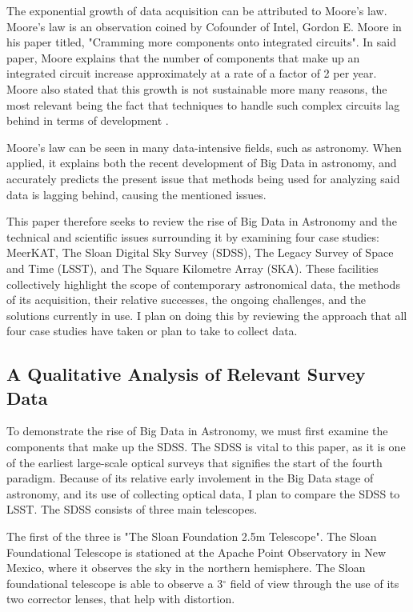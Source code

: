 \documentclass[preprint2,linenumbers, longauthor]{aastex631}
\begin{document}
The exponential growth of data acquisition can be attributed to Moore's law. Moore's law is an observation coined by Cofounder of Intel, Gordon E. Moore in his paper titled, "Cramming more components onto integrated circuits". 
In said paper, Moore explains that the number of components that make up an integrated circuit increase approximately at a rate of a factor of 2 per year.
Moore also stated that this growth is not sustainable more many reasons, the most relevant being the fact that techniques to handle such complex circuits lag behind in terms of development \cite{mooreCrammingMoreComponents2006}.

Moore's law can be seen in many data-intensive fields, such as astronomy.
When applied, it explains both the recent development of Big Data in astronomy, and accurately predicts the present issue that methods being used for analyzing said data is lagging behind, causing the mentioned issues.

This paper therefore seeks to review the rise of Big Data in Astronomy and the technical and scientific issues surrounding it by examining four case studies: MeerKAT, The Sloan Digital Sky Survey (SDSS), The Legacy Survey of Space and Time (LSST), and The Square Kilometre Array (SKA). 
These facilities collectively highlight the scope of contemporary astronomical data, the methods of its acquisition, their relative successes, the ongoing challenges, and the solutions currently in use. I plan on doing this by reviewing the approach that all four case studies have taken or plan to take to collect data.

\subsection{A Qualitative Analysis of Relevant Survey Data}
To demonstrate the rise of Big Data in Astronomy, we must first examine the components that make up the SDSS. The SDSS is vital to this paper, as it is one of the earliest large-scale optical surveys that signifies the start of the fourth paradigm. 
Because of its relative early involement in the Big Data stage of astronomy, and its use of collecting optical data, I plan to compare the SDSS to LSST. The SDSS
consists of three main telescopes.

The first of the three is "The Sloan Foundation 2.5m Telescope". 
The Sloan Foundational Telescope is stationed at the Apache Point Observatory in New Mexico, where it observes the sky in the northern hemisphere. 
The Sloan foundational telescope is able to observe a 3$^\circ$ field of view through the use of its two corrector lenses, that help with distortion. \cite{gunn25TelescopeSloan2006}
\end{document}

